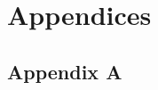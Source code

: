 \documentclass{article}
\begin{document}
\newpage



\newpage
\section{Appendices}
\subsection{Appendix A}
\end{document}
